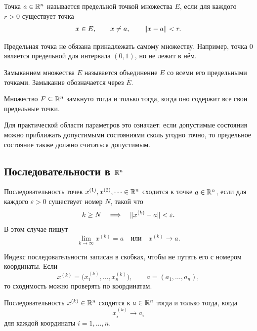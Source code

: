 \begin{definition}
Точка \(a\in\mathbb{R}^n\) называется предельной точкой множества \(E\), если для каждого \(r>0\) существует точка
\[
x\in E,
\qquad
x\neq a,
\qquad
\lVert x-a\rVert<r.
\]
\end{definition}

Предельная точка не обязана принадлежать самому множеству. Например, точка \(0\) является предельной для интервала \((0,1)\), но не лежит в нём.

\begin{definition}
Замыканием множества \(E\) называется объединение \(E\) со всеми его предельными точками. Замыкание обозначается через \(\overline E\).
\end{definition}

\begin{criterion}
Множество \(F\subseteq\mathbb{R}^n\) замкнуто тогда и только тогда, когда оно содержит все свои предельные точки.
\end{criterion}

Для практической области параметров это означает: если допустимые состояния можно приближать допустимыми состояниями сколь угодно точно, то предельное состояние также должно считаться допустимым.

\subsection{Последовательности в \texorpdfstring{$\mathbb{R}^n$}{R n}}

\begin{definition}
Последовательность точек \(x^{(1)},x^{(2)},\dots\in\mathbb{R}^n\) сходится к точке \(a\in\mathbb{R}^n\), если для каждого \(\varepsilon>0\) существует номер \(N\), такой что
\[
k\geq N
\quad\Longrightarrow\quad
\lVert x^{(k)}-a\rVert<\varepsilon.
\]
В этом случае пишут
\[
\lim_{k\to\infty}x^{(k)}=a
\quad\text{или}\quad
x^{(k)}\to a.
\]
\end{definition}

Индекс последовательности записан в скобках, чтобы не путать его с номером координаты. Если
\[
x^{(k)}=
\bigl(x_1^{(k)},\dots,x_n^{(k)}\bigr),
\qquad
a=(a_1,\dots,a_n),
\]
то сходимость можно проверять по координатам.

\begin{theorem}
Последовательность \(x^{(k)}\in\mathbb{R}^n\) сходится к \(a\in\mathbb{R}^n\) тогда и только тогда, когда
\[
x_i^{(k)}\to a_i
\]
для каждой координаты \(i=1,\dots,n\).
\end{theorem}

